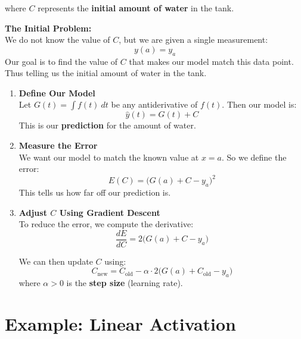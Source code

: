 \documentclass[11pt]{article}
\begin{document}
where $C$ represents the \textbf{initial amount of water} in the tank.

\vspace{0.5cm}

\textbf{The Initial Problem:} \\
We do not know the value of $C$, but we are given a single  measurement:
\[
y(a) = y_a
\]
Our goal is to find the value of $C$ that makes our model match this data point. Thus telling us the initial amount of water in the tank.

\vspace{0.5cm}
\begin{enumerate}
\item \textbf{Define Our Model} \\
Let $G(t) = \int f(t) \ dt$ be any antiderivative of $f(t)$. Then our model is:
\[
\hat{y}(t) = G(t) + C
\]
This is our \textbf{prediction} for the amount of water.

\vspace{0.5cm}

\item \textbf{Measure the Error} \\
We want our model to match the known value at $x=a$. So we define the error:
\[
E(C) = \big(G(a) + C - y_a\big)^2
\]
This tells us how far off our prediction is.

\vspace{0.5cm}

\item \textbf{Adjust $C$ Using Gradient Descent} \\
To reduce the error, we compute the derivative:
\[
\frac{dE}{dC} = 2\big(G(a) + C - y_a\big)
\]

We can then update $C$ using:
\[
C_{\text{new}} = C_{\text{old}} - \alpha \cdot 2\big(G(a) + C_{\text{old}} - y_a\big)
\]
where $\alpha > 0$ is the \textbf{step size} (learning rate).
\end{enumerate}
\vspace{0.5cm}

\section*{Example: Linear Activation}
\end{document}
